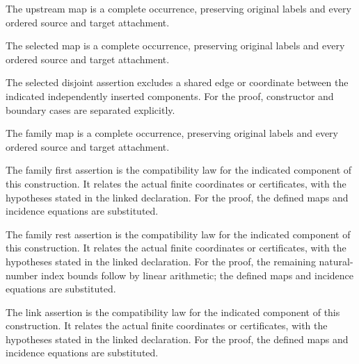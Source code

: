 The upstream map is a complete occurrence, preserving original labels and every ordered source and target attachment.
\par{}

The selected map is a complete occurrence, preserving original labels and every ordered source and target attachment.
\par{}

The selected disjoint assertion excludes a shared edge or coordinate between the indicated independently inserted components.
For the proof, constructor and boundary cases are separated explicitly.
\par{}

The family map is a complete occurrence, preserving original labels and every ordered source and target attachment.
\par{}

The family first assertion is the compatibility law for the indicated component of this construction. It relates the actual finite coordinates or certificates, with the hypotheses stated in the linked declaration.
For the proof, the defined maps and incidence equations are substituted.
\par{}

The family rest assertion is the compatibility law for the indicated component of this construction. It relates the actual finite coordinates or certificates, with the hypotheses stated in the linked declaration.
For the proof, the remaining natural-number index bounds follow by linear arithmetic; the defined maps and incidence equations are substituted.
\par{}

The link assertion is the compatibility law for the indicated component of this construction. It relates the actual finite coordinates or certificates, with the hypotheses stated in the linked declaration.
For the proof, the defined maps and incidence equations are substituted.
\par{}

